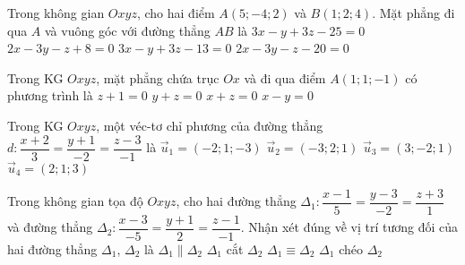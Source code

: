 \begin{ex}%
Trong không gian $O x y z$, cho hai điểm $A(5 ;-4 ; 2)$ và $B(1 ; 2 ; 4)$. Mặt phẳng đi qua $A$ và vuông góc với đường thẳng $A B$ là
\choice
{$3x-y+3z-25=0$}
{$2x-3y-z+8=0$}
{$3x-y+3z-13=0$}
{\True $2x-3y-z-20=0$}
\end{ex}

\begin{ex}%
Trong KG $Oxyz$, mặt phẳng chứa trục $Ox$ và đi qua điểm $A(1;1;-1)$ có phương trình là
\choice
{$z+1=0$}
{\True $y+z=0$}
{$x+z=0$}
{$x-y=0$}
\end{ex}

\begin{ex}%
Trong KG $Oxyz$, một véc-tơ chỉ phương của đường thẳng $d\colon \dfrac{x+2}{3}=\dfrac{y+1}{-2}=\dfrac{z-3}{-1}$ là
\choice
{$\overrightarrow{u}_1=(-2;1;-3)$}
{\True $\overrightarrow{u}_2=(-3;2;1)$}
{$\overrightarrow{u}_3=(3;-2;1)$}
{$\overrightarrow{u}_4=(2;1;3)$}
\end{ex}

\begin{ex}%
Trong không gian tọa độ $Oxyz$, cho hai đường thẳng $\Delta_1\colon \dfrac{x-1}{5}=\dfrac{y-3}{-2}=\dfrac{z+3}{1}$ và đường thẳng $\Delta_2\colon \dfrac{x-3}{-5}=\dfrac{y+1}{2}=\dfrac{z-1}{-1}$. Nhận xét đúng về vị trí tương đối của hai đường thẳng $\Delta_1$, $\Delta_2$ là
\choice
{\True $\Delta_1\parallel\Delta_2$}
{$\Delta_1$ cắt $\Delta_2$}
{$\Delta_1\equiv\Delta_2$}
{$\Delta_1$ chéo $\Delta_2$}
\end{ex}

